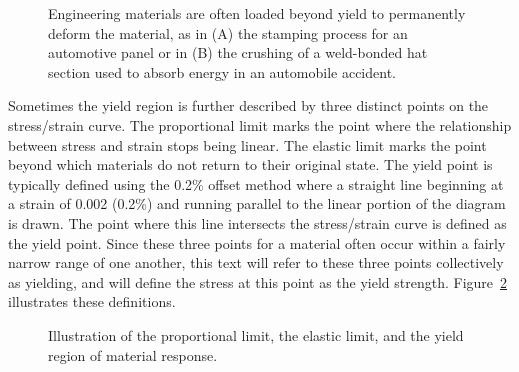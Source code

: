 \documentclass[
  letterpaper,
  DIV=11,
  numbers=noendperiod]{scrreprt}
\theoremstyle{definition}
\theoremstyle{remark}
\begin{document}
\begin{figure}


\caption{\label{fig-4.3}Engineering materials are often loaded beyond
yield to permanently deform the material, as in (A) the stamping process
for an automotive panel or in (B) the crushing of a weld-bonded hat
section used to absorb energy in an automobile accident.}

\end{figure}%

Sometimes the yield region is further described by three distinct points
on the stress/strain curve. The proportional limit marks the point where
the relationship between stress and strain stops being linear. The
elastic limit marks the point beyond which materials do not return to
their original state. The yield point is typically defined using the
0.2\% offset method where a straight line beginning at a strain of 0.002
(0.2\%) and running parallel to the linear portion of the diagram is
drawn. The point where this line intersects the stress/strain curve is
defined as the yield point. Since these three points for a material
often occur within a fairly narrow range of one another, this text will
refer to these three points collectively as yielding, and will define
the stress at this point as the yield strength. Figure~\ref{fig-4.4}
illustrates these definitions.

\begin{figure}


\caption{\label{fig-4.4}Illustration of the proportional limit, the
elastic limit, and the yield region of material response.}

\end{figure}%
\end{document}
